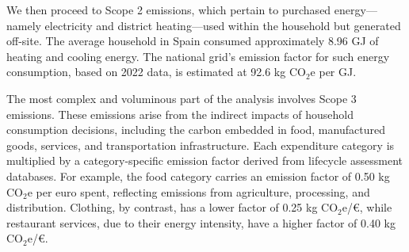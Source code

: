 \documentclass[12pt,a4paper]{article}%
\begin{document}
\begin{table}[h]
\centering
\caption*{\textbf{Table 4.1}: Direct Emissions from Household Energy and Transport (Scope 1)}\label{tab:scope1}
\end{table}


We then proceed to Scope 2 emissions, which pertain to purchased energy—namely electricity and district heating—used within the household but generated off-site. The average household in Spain consumed approximately 8.96 GJ of heating and cooling energy. The national grid's emission factor for such energy consumption, based on 2022 data, is estimated at 92.6 kg CO$_2$e per GJ.

\begin{table}[h]
\centering
\caption*{\textbf{Table 4.2:} Indirect Emissions from Heating and Cooling (Scope 2)}\label{tab:scope2}
\end{table}

The most complex and voluminous part of the analysis involves Scope 3 emissions. These emissions arise from the indirect impacts of household consumption decisions, including the carbon embedded in food, manufactured goods, services, and transportation infrastructure. Each expenditure category is multiplied by a category-specific emission factor derived from lifecycle assessment databases. For example, the food category carries an emission factor of 0.50 kg CO$_2$e per euro spent, reflecting emissions from agriculture, processing, and distribution. Clothing, by contrast, has a lower factor of 0.25 kg CO$_2$e/€, while restaurant services, due to their energy intensity, have a higher factor of 0.40 kg CO$_2$e/€.
\end{document}
